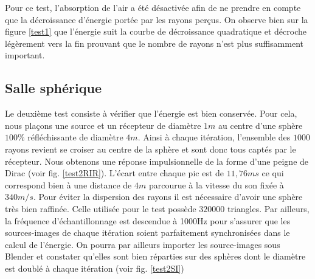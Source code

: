 Pour ce test, l'absorption de l'air a été désactivée afin de ne prendre en compte que la décroissance d'énergie portée par les rayons perçus. On observe bien sur la figure \ref{test1} que l'énergie suit la courbe de décroissance quadratique et décroche légèrement vers la fin prouvant que le nombre de rayons n'est plus suffisamment important.
 		
		
\subsection{Salle sphérique}

Le deuxième test consiste à vérifier que l'énergie est bien conservée. Pour cela, nous plaçons une source et un récepteur de diamètre $1m$ au centre d'une sphère $100\%$ réfléchissante de diamètre $4m$. Ainsi à chaque itération, l'ensemble des $1000$ rayons revient se croiser au centre de la sphère et sont donc tous captés par le récepteur. Nous obtenons une réponse impulsionnelle de la forme d'une peigne de Dirac (voir fig. \ref{test2RIR}). L'écart entre chaque pic est de $11,76 ms$ ce qui correspond bien à une distance de $4m$ parcourue à la vitesse du son fixée à $340m/s$. Pour éviter la dispersion des rayons il est nécessaire d'avoir une sphère très bien raffinée. Celle utilisée pour le test possède $320000$ triangles. Par ailleurs, la fréquence d'échantillonnage est descendue à 1000Hz pour s'assurer que les sources-images de chaque itération soient parfaitement synchronisées dans le calcul de l'énergie. On pourra par ailleurs importer les source-images sous Blender et constater qu'elles sont bien réparties sur des sphères dont le diamètre est doublé à chaque itération (voir fig. \ref{test2SI})

